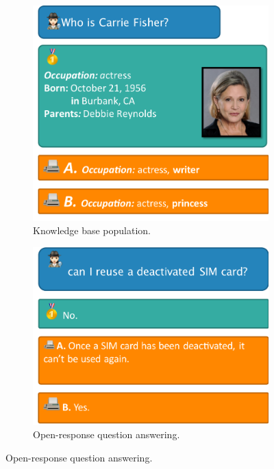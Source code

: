 \begin{figure}
  \hfill
  \begin{subfigure}[t]{0.45\textwidth}
    \includegraphics[width=\textwidth]{figures/err-kbp}
    \caption{\label{fig:intro:example-kbp} Knowledge base population.}
  \end{subfigure}
  \hfill
  \begin{subfigure}[t]{0.45\textwidth}%
    \includegraphics[width=\textwidth]{figures/err-oqa}
    \caption{\label{fig:intro:example-qa} Open-response question answering.}
  \end{subfigure}
  \hfill


\end{figure}
